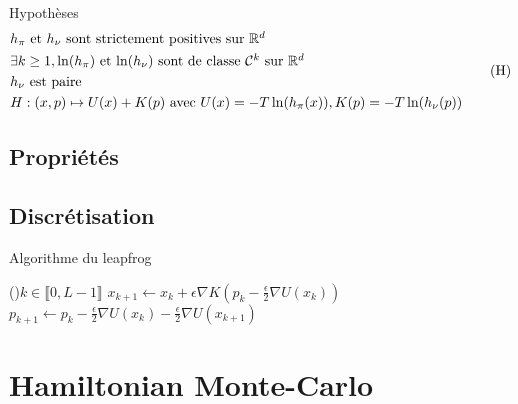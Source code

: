 \documentclass{beamer}
\begin{document}

\begin{frame}{Hypothèses}
	\begin{equation}\label{eq:hyp}
		\begin{aligned}
			&\mbox{$h_\pi$ et $h_\nu$ sont strictement positives sur $\mathbb{R}^d$} \\
			&\mbox{$\exists k \geq 1, \ln(h_\pi)$ et $\ln(h_\nu)$ sont de classe $\mathcal{C}^k$ sur $\mathbb{R}^d$}\\
			&\mbox{$h_\nu$ est paire} \\
	                & H : (x,p) \mapsto U(x) + K(p) \text{ avec } U(x) = - T \ln(h_\pi(x)), K(p) = -T \ln(h_\nu(p))
		\end{aligned}
		\tag{H}
	\end{equation}
\end{frame}

\subsection{Propriétés}


\subsection{Discrétisation}


\begin{frame}{Algorithme du leapfrog}
	\begin{center}
		\begin{algorithm}[H]
			\For(){$k \in \llbracket 0, L-1 \rrbracket$}{
				$x_{k+1} \leftarrow x_k + \epsilon \nabla K \left( p_k - \frac{\epsilon}{2} \nabla U(x_k) \right)$\;
				$p_{k+1} \leftarrow p_k - \frac{\epsilon}{2} \nabla U(x_k) - \frac{\epsilon}{2} \nabla U(x_{k+1})$\;
			}
			\caption{Discrétisation de l'évolution par saute-mouton (\emph{leapfrog})}
			\label{algo:leapfrog}
		\end{algorithm}
	\end{center}
\end{frame}

\section{Hamiltonian Monte-Carlo}
\end{document}

